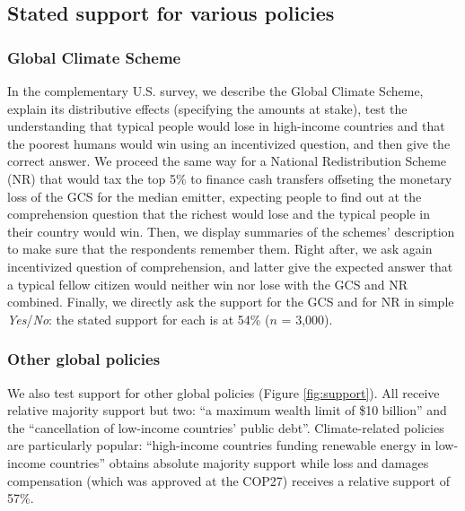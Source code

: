 \subsection{Stated support for various policies}

\subsubsection{Global Climate Scheme} %
In the complementary U.S. survey, we describe the Global Climate Scheme, explain its distributive effects (specifying the amounts at stake), test the understanding that typical people would lose in high-income countries and that the poorest humans would win using an incentivized question, and then give the correct answer. We proceed the same way for a National Redistribution Scheme (NR) that would tax the top 5\% to finance cash transfers offseting the monetary loss of the GCS for the median emitter, expecting people to find out at the comprehension question that the richest would lose and the typical people in their country would win. Then, we display summaries of the schemes' description to make sure that the respondents remember them. Right after, we ask again incentivized question of comprehension, and latter give the expected answer that a typical fellow citizen would neither win nor lose with the GCS and NR combined. Finally, we directly ask the support for the GCS and for NR in simple \textit{Yes}/\textit{No}: the stated support for each is at 54\% ($n$ = 3,000).%

\subsubsection{Other global policies} %
We also test support for other %
global policies (Figure \ref{fig:support}). All receive relative majority support but two: ``a maximum wealth limit of \$10 billion'' and the ``cancellation of low-income countries' public debt''. Climate-related policies are particularly popular: ``high-income countries funding renewable energy in low-income countries'' obtains absolute majority support while loss and damages compensation (which was approved at the COP27) receives a relative support of  57\%. 

